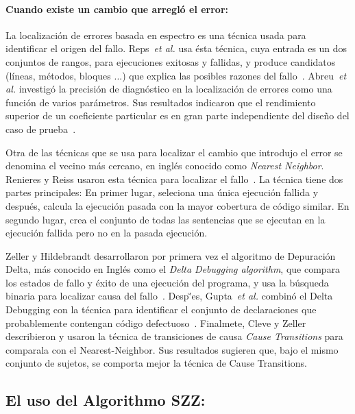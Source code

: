 \documentclass[a4paper, 12pt]{book}
\begin{document}
\paragraph{Cuando existe un cambio que arregl\'o el error:}
La localizaci\'on de errores basada en espectro es una t\'ecnica usada para identificar el origen del fallo. Reps~\textit{et al.} usa \'esta t\'ecnica, cuya entrada es un dos conjuntos de rangos, para ejecuciones exitosas y fallidas, y produce candidatos (l\'ineas, m\'etodos, bloques ...) que explica las posibles razones del fallo~\cite{reps}. Abreu~\textit{et al.} investig\'o la precisi\'on de diagn\'ostico en la localizaci\'on de errores como una funci\'on de varios par\'ametros. Sus resultados indicaron que el rendimiento superior de un coeficiente particular es en gran parte independiente del dise\~no del caso de prueba~\cite{abreu2007accuracy}.

Otra de las t\'ecnicas que se usa para localizar el cambio que introdujo el error se denomina el vecino m\'as cercano, en ingl\'es conocido como \emph{Nearest Neighbor}. Renieres y Reiss usaron esta t\'ecnica para localizar el fallo~\cite{renieres2003fault}. La t\'ecnica tiene dos partes principales: En primer lugar, seleciona una \'unica ejecuci\'on fallida y despu\'es, calcula la ejecuci\'on pasada con la mayor cobertura de c\'odigo similar. En segundo lugar, crea el conjunto de todas las sentencias que se ejecutan en la ejecuci\'on fallida pero no en la pasada ejecuci\'on.


Zeller y Hildebrandt desarrollaron por primera vez el algoritmo de Depuraci\'on Delta, m\'as conocido en Ingl\'es como el \emph{Delta Debugging algorithm}, que compara los estados de fallo y \'exito de una ejecuci\'on del  programa, y usa la b\'usqueda binaria para localizar causa del fallo~\cite{zeller2002simplifying}. Desp\u'es, Gupta~\textit{et al.} combin\'o el Delta Debugging
con la  t\'ecnica para identificar el conjunto de declaraciones que probablemente contengan c\'odigo defectuoso~\cite{gupta2005locating}. Finalmete, Cleve y Zeller~\cite{cleve2005locating} describieron y usaron la t\'ecnica de transiciones de causa \emph{Cause Transitions} para comparala con el Nearest-Neighbor. Sus resultados sugieren que, bajo el mismo conjunto de sujetos, se comporta mejor la t\'ecnica de Cause Transitions.


\subsection{El uso del Algorithmo SZZ:}
\label{subsec:SZZuso}
\end{document}
